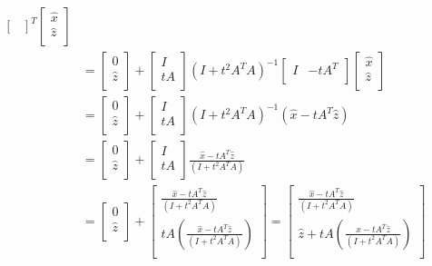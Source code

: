 \documentclass{article}
\theoremstyle{definition}
\theoremstyle{remark}
\begin{document}
\begin{align*}
{\begin{bmatrix}
  \end{bmatrix}}^T
  \begin{bmatrix}
    \hat{x} \\
    \hat{z} \\
  \end{bmatrix} \\
  &= 
  \begin{bmatrix}
    0 \\
    \hat{z} \\
  \end{bmatrix}
  + 
  \begin{bmatrix}
    I \\
    tA \\
  \end{bmatrix}
  {(I + t^2A^T A)}^{-1}
  \begin{bmatrix}
    I & -tA^T \\
  \end{bmatrix}
  \begin{bmatrix}
    \hat{x} \\
    \hat{z} \\
  \end{bmatrix} \\
  &= 
  \begin{bmatrix}
    0 \\
    \hat{z} \\
  \end{bmatrix}
  + 
  \begin{bmatrix}
    I \\
    tA \\
  \end{bmatrix}
  {(I + t^2A^T A)}^{-1}
  (\hat{x} - tA^T \hat{z}) \\
  &= 
  \begin{bmatrix}
    0 \\
    \hat{z} \\
  \end{bmatrix}
  + 
  \begin{bmatrix}
    I \\
    tA \\
  \end{bmatrix}
  \frac{\hat{x} - tA^T \hat{z}}{(I + t^2A^T A)} \\
  &=
  \begin{bmatrix}
    0 \\
    \hat{z} \\
  \end{bmatrix}
  +
  \begin{bmatrix}
    \frac{\hat{x} - tA^T \hat{z}}{(I + t^2A^T A)} \\
    tA \left(\frac{\hat{x} - tA^T \hat{z}}{(I + t^2A^T A)}\right) \\
  \end{bmatrix} = 
  \begin{bmatrix}
    \frac{\hat{x} - tA^T \hat{z}}{(I + t^2A^T A)} \\
    \hat{z} + tA \left(\frac{\hat{x} - tA^T \hat{z}}{(I + t^2A^T A)}\right) \\
  \end{bmatrix} \\
\end{align*}
\end{document}
